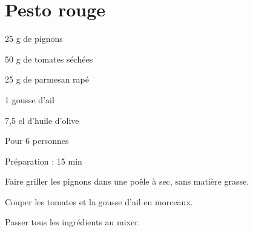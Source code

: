 \section[\normalsize{Pesto rouge}]{Pesto rouge}

\begin{ingredients}
\item 25 g de pignons
\item 50 g de tomates s\'ech\'ees
\item 25 g de parmesan rap\'e
\item 1 gousse d’ail
\item 7,5 cl d’huile d’olive
\end{ingredients}
\begin{infos}
\item Pour 6 personnes
\item Préparation : 15 min
\end{infos}
\begin{etapes}
\item Faire griller les pignons dans une po\^ele \`a sec, sans 
mati\`ere grasse.
\item Couper les tomates et la gousse d’ail en morceaux.
\item Passer tous les ingr\'edients au mixer.
\end{etapes}
\begin{conseils}
\end{conseils}